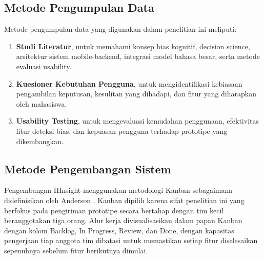 \documentclass[11pt]{article}
\begin{document}
\subsection{Metode Pengumpulan Data}
Metode pengumpulan data yang digunakan dalam penelitian ini meliputi:
\begin{enumerate}
  \item \textbf{Studi Literatur}, untuk memahami konsep bias kognitif, decision science, arsitektur sistem mobile-backend, integrasi model bahasa besar, serta metode evaluasi usability.
  \item \textbf{Kuesioner Kebutuhan Pengguna}, untuk mengidentifikasi kebiasaan pengambilan keputusan, kesulitan yang dihadapi, dan fitur yang diharapkan oleh mahasiswa.
  \item \textbf{Usability Testing}, untuk mengevaluasi kemudahan penggunaan, efektivitas fitur deteksi bias, dan kepuasan pengguna terhadap prototipe yang dikembangkan.
\end{enumerate}
 
\subsection{Metode Pengembangan Sistem}
Pengembangan HInsight menggunakan metodologi Kanban sebagaimana didefinisikan oleh Anderson \cite{anderson2010}. Kanban dipilih karena sifat penelitian ini yang berfokus pada pengiriman prototipe secara bertahap dengan tim kecil beranggotakan tiga orang. Alur kerja divisualisasikan dalam papan Kanban dengan kolom Backlog, In Progress, Review, dan Done, dengan kapasitas pengerjaan tiap anggota tim dibatasi untuk memastikan setiap fitur diselesaikan sepenuhnya sebelum fitur berikutnya dimulai.
 
\end{document}
